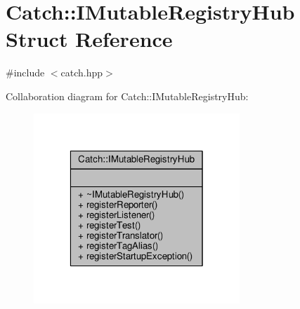 \hypertarget{struct_catch_1_1_i_mutable_registry_hub}{\section{Catch\-:\-:I\-Mutable\-Registry\-Hub Struct Reference}
\label{struct_catch_1_1_i_mutable_registry_hub}
}


{\ttfamily \#include $<$catch.\-hpp$>$}



Collaboration diagram for Catch\-:\-:I\-Mutable\-Registry\-Hub\-:
\nopagebreak
\begin{figure}[H]
\begin{center}
\leavevmode
\includegraphics[width=220pt]{struct_catch_1_1_i_mutable_registry_hub__coll__graph}
\end{center}
\end{figure}

